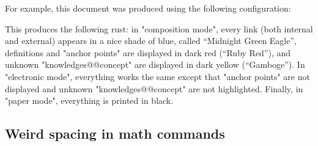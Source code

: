 \documentclass{article}
\begin{document}
For example, this document was produced using the following configuration:
\begin{spverbatim}

\end{spverbatim}

This produces the following rust: in "composition mode",
every link (both internal and external) appears in 
a nice shade of blue, called ``Midnight Green Eagle'', definitions and "anchor 
points" are displayed in dark red (``Ruby Red''), and unknown 
"knowledges@@concept" are displayed in dark yellow (``Gamboge'').
In "electronic mode", everything works the same except that
"anchor points" are not displayed and unknown "knowledges@@concept" are 
not highlighted. Finally, in "paper mode", everything is printed in black.

\subsection{Weird spacing in math commands}
\end{document}
